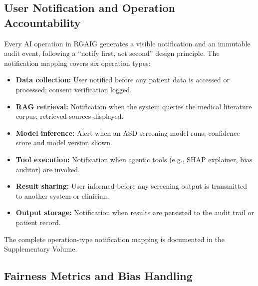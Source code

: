 \subsection{User Notification and Operation Accountability}
\label{sec:user_notification}


Every AI operation in RGAIG generates a visible notification and an immutable audit event, following a ``notify first, act second'' design principle. The notification mapping covers six operation types:

\begin{itemize}[leftmargin=*, itemsep=3pt]
    \item \textbf{Data collection:} User notified before any patient data is accessed or processed; consent verification logged.
    \item \textbf{RAG retrieval:} Notification when the system queries the medical literature corpus; retrieved sources displayed.
    \item \textbf{Model inference:} Alert when an ASD screening model runs; confidence score and model version shown.
    \item \textbf{Tool execution:} Notification when agentic tools (e.g., SHAP explainer, bias auditor) are invoked.
    \item \textbf{Result sharing:} User informed before any screening output is transmitted to another system or clinician.
    \item \textbf{Output storage:} Notification when results are persisted to the audit trail or patient record.
\end{itemize}

\noindent The complete operation-type notification mapping is documented in the Supplementary Volume.


\subsection{Fairness Metrics and Bias Handling}
\label{sec:fairness_bias}


